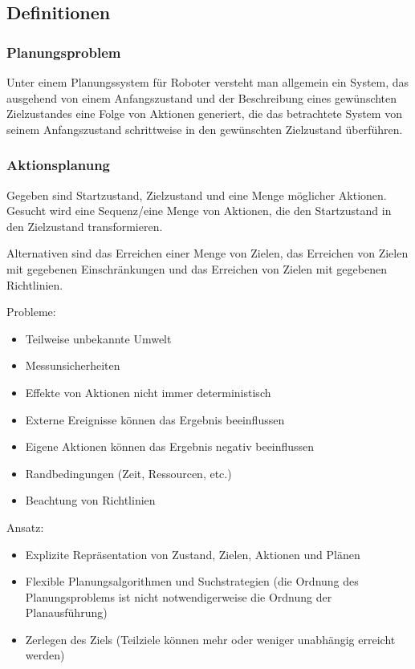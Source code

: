 \setlength\parindent{0pt}

\subsection{Definitionen}

\subsubsection{Planungsproblem}
Unter einem Planungssystem für Roboter versteht man allgemein ein System, das ausgehend von einem Anfangszustand und der Beschreibung eines gewünschten Zielzustandes eine Folge von Aktionen generiert, die das betrachtete System von seinem Anfangszustand schrittweise in den gewünschten Zielzustand überführen.

\subsubsection{Aktionsplanung}
Gegeben sind Startzustand, Zielzustand und eine Menge möglicher Aktionen.
Gesucht wird eine Sequenz/eine Menge von Aktionen, die den Startzustand in den Zielzustand transformieren.

Alternativen sind das Erreichen einer Menge von Zielen, das Erreichen von Zielen mit gegebenen Einschränkungen und das Erreichen von Zielen mit gegebenen Richtlinien.

Probleme:
\begin{itemize}
	\item Teilweise unbekannte Umwelt
	\item Messunsicherheiten
	\item Effekte von Aktionen nicht immer deterministisch
	\item Externe Ereignisse können das Ergebnis beeinflussen
	\item Eigene Aktionen können das Ergebnis negativ beeinflussen
	\item Randbedingungen (Zeit, Ressourcen, etc.)
	\item Beachtung von Richtlinien
\end{itemize}

Ansatz:
\begin{itemize}
	\item Explizite Repräsentation von Zustand, Zielen, Aktionen und Plänen
	\item Flexible Planungsalgorithmen und Suchstrategien (die Ordnung des Planungsproblems ist nicht notwendigerweise die Ordnung der Planausführung)
	\item Zerlegen des Ziels (Teilziele können mehr oder weniger unabhängig erreicht werden)
\end{itemize}

